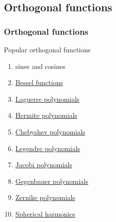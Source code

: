 \documentclass[handout]{beamer}
\begin{document}
\subsection{Orthogonal functions}
\begin{frame}      %
\frametitle{Orthogonal functions}
  Popular orthogonal functions
  \begin{enumerate}
    \item sines and cosines
    \item \href{http://mathworld.wolfram.com/BesselFunction.html}{Bessel functions}
    \item \href{http://mathworld.wolfram.com/LaguerrePolynomial.html}{Laguerre polynomials}
    \item \href{http://mathworld.wolfram.com/HermitePolynomial.html}{Hermite polynomials}
    \item \href{http://mathworld.wolfram.com/ChebyshevPolynomialoftheFirstKind.html}{Chebyshev polynomials}
    \item \href{http://mathworld.wolfram.com/LegendrePolynomial.html}{Legendre polynomials}
    \item \href{http://mathworld.wolfram.com/JacobiPolynomial.html}{Jacobi polynomials}
    \item \href{http://mathworld.wolfram.com/GegenbauerPolynomial.html}{Gegenbauer polynomials}
    \item \href{http://mathworld.wolfram.com/ZernikePolynomial.html}{Zernike polynomials}
    \item \href{http://mathworld.wolfram.com/SphericalHarmonic.html}{Spherical harmonics}
  \end{enumerate}
\end{frame}
\end{document}
